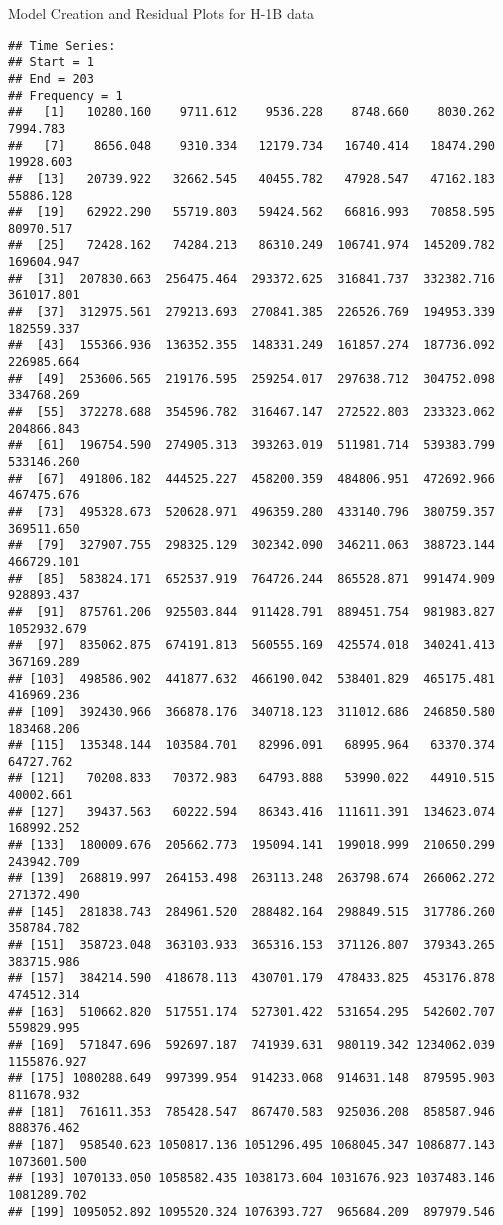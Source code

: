 \documentclass[
  ignorenonframetext,
]{beamer}
\begin{document}
\begin{frame}[fragile]{Model Creation and Residual Plots for H-1B data}
\begin{verbatim}
## Time Series:
## Start = 1 
## End = 203 
## Frequency = 1 
##   [1]   10280.160    9711.612    9536.228    8748.660    8030.262    7994.783
##   [7]    8656.048    9310.334   12179.734   16740.414   18474.290   19928.603
##  [13]   20739.922   32662.545   40455.782   47928.547   47162.183   55886.128
##  [19]   62922.290   55719.803   59424.562   66816.993   70858.595   80970.517
##  [25]   72428.162   74284.213   86310.249  106741.974  145209.782  169604.947
##  [31]  207830.663  256475.464  293372.625  316841.737  332382.716  361017.801
##  [37]  312975.561  279213.693  270841.385  226526.769  194953.339  182559.337
##  [43]  155366.936  136352.355  148331.249  161857.274  187736.092  226985.664
##  [49]  253606.565  219176.595  259254.017  297638.712  304752.098  334768.269
##  [55]  372278.688  354596.782  316467.147  272522.803  233323.062  204866.843
##  [61]  196754.590  274905.313  393263.019  511981.714  539383.799  533146.260
##  [67]  491806.182  444525.227  458200.359  484806.951  472692.966  467475.676
##  [73]  495328.673  520628.971  496359.280  433140.796  380759.357  369511.650
##  [79]  327907.755  298325.129  302342.090  346211.063  388723.144  466729.101
##  [85]  583824.171  652537.919  764726.244  865528.871  991474.909  928893.437
##  [91]  875761.206  925503.844  911428.791  889451.754  981983.827 1052932.679
##  [97]  835062.875  674191.813  560555.169  425574.018  340241.413  367169.289
## [103]  498586.902  441877.632  466190.042  538401.829  465175.481  416969.236
## [109]  392430.966  366878.176  340718.123  311012.686  246850.580  183468.206
## [115]  135348.144  103584.701   82996.091   68995.964   63370.374   64727.762
## [121]   70208.833   70372.983   64793.888   53990.022   44910.515   40002.661
## [127]   39437.563   60222.594   86343.416  111611.391  134623.074  168992.252
## [133]  180009.676  205662.773  195094.141  199018.999  210650.299  243942.709
## [139]  268819.997  264153.498  263113.248  263798.674  266062.272  271372.490
## [145]  281838.743  284961.520  288482.164  298849.515  317786.260  358784.782
## [151]  358723.048  363103.933  365316.153  371126.807  379343.265  383715.986
## [157]  384214.590  418678.113  430701.179  478433.825  453176.878  474512.314
## [163]  510662.820  517551.174  527301.422  531654.295  542602.707  559829.995
## [169]  571847.696  592697.187  741939.631  980119.342 1234062.039 1155876.927
## [175] 1080288.649  997399.954  914233.068  914631.148  879595.903  811678.932
## [181]  761611.353  785428.547  867470.583  925036.208  858587.946  888376.462
## [187]  958540.623 1050817.136 1051296.495 1068045.347 1086877.143 1073601.500
## [193] 1070133.050 1058582.435 1038173.604 1031676.923 1037483.146 1081289.702
## [199] 1095052.892 1095520.324 1076393.727  965684.209  897979.546
\end{verbatim}


\end{frame}
\end{document}
